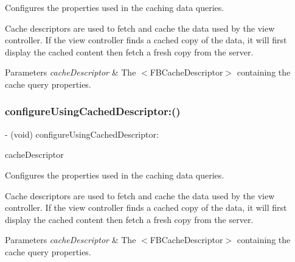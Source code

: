 Configures the properties used in the caching data queries.

Cache descriptors are used to fetch and cache the data used by the view controller. If the view controller finds a cached copy of the data, it will first display the cached content then fetch a fresh copy from the server.


\begin{DoxyParams}{Parameters}
{\em cache\+Descriptor} & The $<$\+F\+B\+Cache\+Descriptor$>$ containing the cache query properties. \\
\hline
\end{DoxyParams}
\mbox{\label{interfaceFBFriendPickerViewController_aec8ccc14e83ba67dfebf0ffcc09253f8}} 
\subsubsection{\texorpdfstring{configure\+Using\+Cached\+Descriptor\+:()}{configureUsingCachedDescriptor:()}\hspace{0.1cm}{\footnotesize\ttfamily [2/5]}}
{\footnotesize\ttfamily -\/ (void) configure\+Using\+Cached\+Descriptor\+: \begin{DoxyParamCaption}\item[{(\hyperlink{interfaceFBCacheDescriptor}{F\+B\+Cache\+Descriptor} $\ast$)}]{cache\+Descriptor }\end{DoxyParamCaption}}

Configures the properties used in the caching data queries.

Cache descriptors are used to fetch and cache the data used by the view controller. If the view controller finds a cached copy of the data, it will first display the cached content then fetch a fresh copy from the server.


\begin{DoxyParams}{Parameters}
{\em cache\+Descriptor} & The $<$\+F\+B\+Cache\+Descriptor$>$ containing the cache query properties. \\
\hline
\end{DoxyParams}
\mbox{\label{interfaceFBFriendPickerViewController_aec8ccc14e83ba67dfebf0ffcc09253f8}} 
